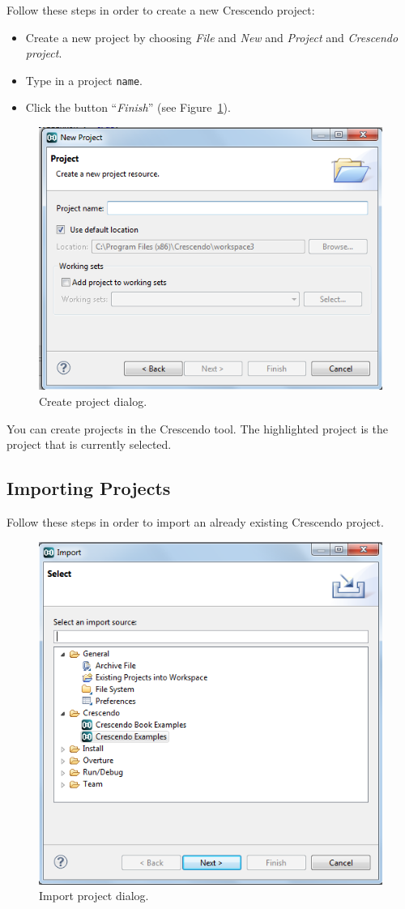 \documentclass{crescendorepchap}
\begin{document}
Follow these steps in order to create a new Crescendo project:

\begin{itemize}
\item
  Create a new project by choosing \emph{File} and \emph{New} and
  \emph{Project} and \emph{Crescendo project}.
\item
  Type in a project \texttt{name}.
\item
  Click the button ``\emph{Finish}'' (see Figure~\ref{fig:NewProject}).
\end{itemize}

\begin{figure}[htbp]
\centering
\includegraphics[width=.6\textwidth]{images/DestecsNewProject.png}
\caption{Create project dialog.\label{fig:NewProject}}
\end{figure}

You can create projects in the Crescendo tool. The highlighted project is
the project that is currently selected.

\subsection{Importing Projects}

Follow these steps in order to import an already existing Crescendo
project.

\begin{figure}[htbp]
\centering
\includegraphics[width=.6\textwidth]{images/DestecsImportDialog.png}
\caption{Import project dialog.\label{fig:ImportDialogue}}
\end{figure}
\end{document}
